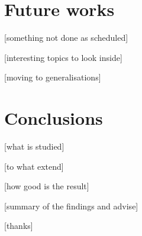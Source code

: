\documentclass[12pt,a4paper]{report}
\begin{document}



















\chapter{Future works}

[something not done as scheduled]

[interesting topics to look inside]

[moving to generalisations]









\chapter{Conclusions}

[what is studied]

[to what extend]

[how good is the result]

[summary of the findings and advise]

[thanks]
\end{document}

